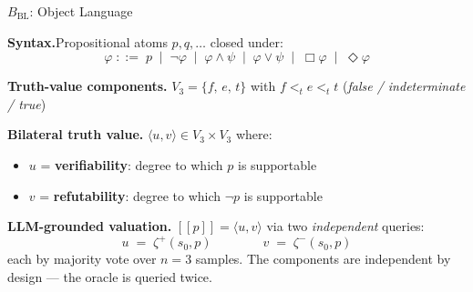 \documentclass[aspectratio=169,9pt]{beamer}
\newcommand{\tv}[2]{\langle #1,#2 \rangle}
\newcommand{\semp}{[\![p]\!]}
\newcommand{\BBL}{{B_{\mathrm{BL}}}}
\begin{document}
\begin{frame}{$\BBL$: Object Language}

  \textbf{Syntax.}\quad Propositional atoms $p,q,\ldots$ closed under:
  \[
    \varphi \;::=\; p \;\mid\; \neg\varphi \;\mid\; \varphi\wedge\psi
                \;\mid\; \varphi\vee\psi \;\mid\; \Box\varphi \;\mid\; \Diamond\varphi
  \]

  \medskip\pause

  \textbf{Truth-value components.}\quad
  $V_3 = \{f,\, e,\, t\}$ with $f <_t e <_t t$
  \hfill
  (\textit{false / indeterminate / true})

  \medskip\pause

  \textbf{Bilateral truth value.}\quad
  $\tv{u}{v} \in V_3 \times V_3$ where:
  \begin{itemize}
    \item $u$ = \textbf{verifiability}: degree to which $p$ is supportable
    \item $v$ = \textbf{refutability}: degree to which $\neg p$ is supportable
  \end{itemize}

  \medskip\pause

  \textbf{LLM-grounded valuation.}\quad
  $\semp = \tv{u}{v}$ via two \emph{independent} queries:
  \[
    u \;=\; \zeta^+(s_0, p)
    \qquad\qquad
    v \;=\; \zeta^-(s_0, p)
  \]
  each by majority vote over $n=3$ samples.
  The components are independent by design — the oracle is queried twice.

\end{frame}
\end{document}
